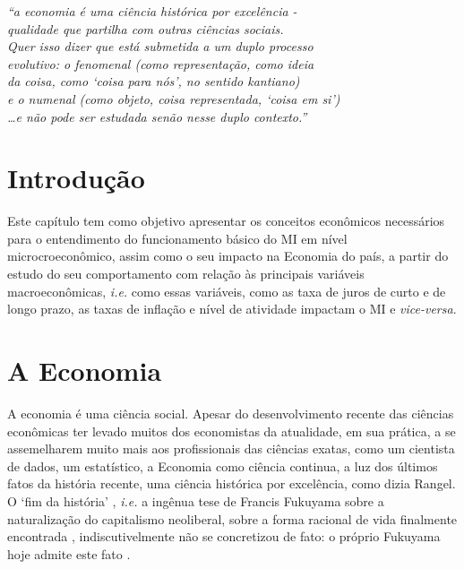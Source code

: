 \documentclass[
	12pt,				%
	oneside,			%
	a4paper,			%
	chapter=TITLE,		%
	section=TITLE,		%
	english,			%
	brazil				%
	]{abntex2}
\begin{document}
\begin{refsection}
\begin{epigrafe}
    \vspace*{\fill}
    \begin{flushright}
    \textit{``a economia é uma ciência histórica por excelência -\\
    qualidade que partilha com outras ciências sociais.\\
    Quer isso dizer que está submetida a um duplo processo\\
    evolutivo: o fenomenal (como representação, como ideia \\
    da coisa, como `coisa para nós', no sentido kantiano)\\
    e o numenal (como objeto, coisa representada, `coisa em si')\\
    \ldots e não pode ser estudada senão nesse duplo contexto.''\\
    \cite[p.~204]{rangel1956}}
    \end{flushright}
\end{epigrafe}
\hypertarget{introduuxe7uxe3o-1}{%
\section{Introdução}\label{introduuxe7uxe3o-1}}

Este capítulo tem como objetivo apresentar os conceitos econômicos necessários
para o entendimento do funcionamento básico do \gls{MI} em nível
microcroeconômico, assim como o seu impacto na Economia do país, a
partir do estudo do seu comportamento com relação às principais variáveis
macroeconômicas, \emph{i.e.} como essas variáveis, como as taxa de juros de curto e
de longo prazo, as taxas de inflação e nível de atividade impactam o \gls{MI} e
\emph{vice-versa}.

\hypertarget{a-economia}{%
\section{A Economia}\label{a-economia}}

A economia é uma ciência social. Apesar do desenvolvimento recente das ciências
econômicas ter levado muitos dos economistas da atualidade, em sua prática, a se
assemelharem muito mais aos profissionais das ciências exatas, como um cientista
de dados, um estatístico, a Economia como ciência continua, a luz dos últimos
fatos da história recente, uma ciência histórica por excelência, como dizia
Rangel. O `fim da história' \autocite{fukuyama}, \emph{i.e.} a ingênua tese de Francis
Fukuyama sobre a naturalização do capitalismo neoliberal, sobre a forma racional
de vida finalmente encontrada \autocite[401]{zizek2011}, indiscutivelmente não se
concretizou de fato: o próprio Fukuyama hoje admite este fato
\autocite{menand_francis_nodate}.


\end{refsection}
\end{document}

